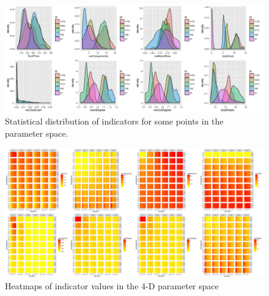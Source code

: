 \documentclass[fleqn,10pt]{wlscirep}
\begin{document}
{%
\begin{figure}
\hspace{-2cm}\includegraphics[width=1.3\textwidth]{figures/indics_distrib.png}
\caption{Statistical distribution of indicators for some points in the parameter space. }
\label{fig:stat-distrib}
\end{figure}



\begin{figure}
\hspace{-2cm}\includegraphics[width=1.3\textwidth]{figures/heatmap_indics}
\caption{Heatmaps of indicator values in the 4-D parameter space}
\label{fig:heatmap}
\end{figure}


}
\end{document}
